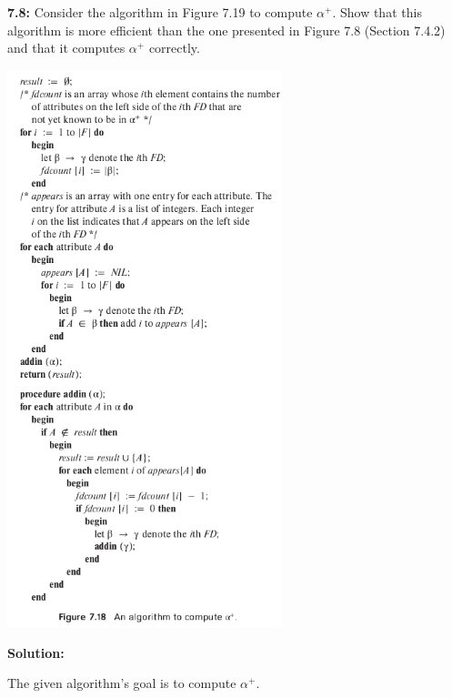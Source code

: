 \documentclass[12pt,a4paper]{article}
\begin{document}
\begin{questionbox}
\textbf{7.8:} Consider the algorithm in Figure 7.19 to compute $\alpha^+$. Show that this algorithm is more efficient than the one presented in Figure 7.8 (Section 7.4.2) and that it computes $\alpha^+$ correctly.
\end{questionbox}
\newline


\includegraphics[width=0.6\textwidth]{Figure7.18.png}
\newpage

\textbf{Solution:}

The given algorithm's goal is to compute $\alpha^+$.
\end{document}
